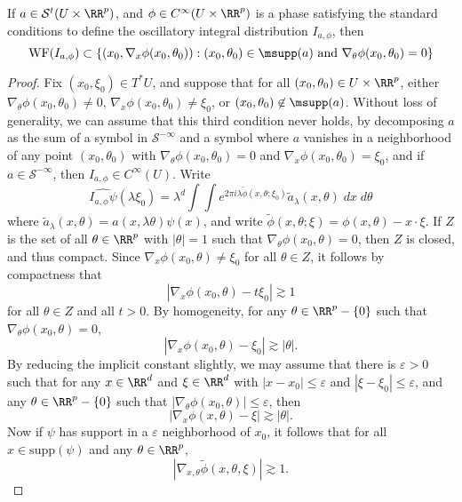 \begin{theorem}
    If $a \in \mathcal{S}^t(U \times \RR^p)$, and $\phi \in C^\infty(U \times \RR^p)$ is a phase satisfying the standard conditions to define the oscillatory integral distribution $I_{a,\phi}$, then
    \[ \text{WF}(I_{a,\phi}) \subset \{ (x_0,\nabla_x \phi(x_0,\theta_0)): (x_0,\theta_0) \in \msupp(a)\ \text{and}\ \nabla_\theta \phi(x_0,\theta_0) = 0 \} \]
\end{theorem}
\begin{proof}
    Fix $(x_0,\xi_0) \in T^* U$, and suppose that for all $(x_0,\theta_0) \in U \times \RR^p$, either $\nabla_\theta \phi(x_0,\theta_0) \neq 0$, $\nabla_x \phi(x_0,\theta_0) \neq \xi_0$, or $(x_0,\theta_0) \not \in \msupp(a)$. Without loss of generality, we can assume that this third condition never holds, by decomposing $a$ as the sum of a symbol in $\mathcal{S}^{-\infty}$ and a symbol where $a$ vanishes in a neighborhood of any point $(x_0,\theta_0)$ with $\nabla_\theta \phi(x_0,\theta_0) = 0$ and $\nabla_x \phi(x_0,\theta_0) = \xi_0$, and if $a \in \mathcal{S}^{-\infty}$, then $I_{a,\phi} \in C^\infty(U)$. Write
    \[ \widehat{I_{a,\phi} \psi}(\lambda \xi_0) = \lambda^d \int \int e^{2 \pi i \lambda \tilde{\phi}(x,\theta;\xi_0)} \tilde{a}_\lambda(x,\theta)\; dx\; d\theta \]
    where $\tilde{a}_\lambda(x,\theta) = a(x, \lambda \theta) \psi(x)$, and write $\tilde{\phi}(x,\theta;\xi) = \phi(x,\theta) - x \cdot \xi$. If $Z$ is the set of all $\theta \in \RR^p$ with $|\theta| = 1$ such that $\nabla_\theta \phi(x_0,\theta) = 0$, then $Z$ is closed, and thus compact. Since $\nabla_x \phi(x_0,\theta) \neq \xi_0$ for all $\theta \in Z$, it follows by compactness that
    \[ |\nabla_x \phi(x_0,\theta) - t \xi_0| \gtrsim 1 \]
    for all $\theta \in Z$ and all $t > 0$. By homogeneity, for any $\theta \in \RR^p - \{ 0 \}$ such that $\nabla_\theta \phi(x_0,\theta) = 0$,
    \[ |\nabla_x \phi(x_0,\theta) - \xi_0| \gtrsim |\theta|. \]
    By reducing the implicit constant slightly, we may assume that there is $\varepsilon > 0$ such that for any $x \in \RR^d$ and $\xi \in \RR^d$ with $|x - x_0| \leq \varepsilon$ and $|\xi - \xi_0| \leq \varepsilon$, and any $\theta \in \RR^p - \{ 0 \}$ such that $|\nabla_\theta \phi(x_0,\theta)| \leq \varepsilon$, then
    \[ |\nabla_x \phi(x,\theta) - \xi| \gtrsim |\theta|. \]
    Now if $\psi$ has support in a $\varepsilon$ neighborhood of $x_0$, it follows that for all $x \in \text{supp}(\psi)$ and any $\theta \in \RR^p$,
    \[ |\nabla_{x,\theta} \tilde{\phi}(x,\theta,\xi)| \gtrsim 1. \]

\end{proof}
